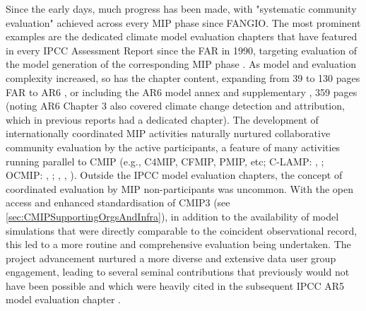 \documentclass[gmd, preprint]{copernicus}
\begin{document}
Since the early days, much progress has been made, with "systematic community evaluation" achieved across every MIP phase since FANGIO. The most prominent examples are the dedicated climate model evaluation chapters that have featured in every IPCC Assessment Report since the FAR in 1990, targeting evaluation of the model generation of the corresponding MIP phase \citep[e.g.,][]{gates_validation_1990,gates_climate_1996,mcavaney_model_2001,randall_climate_2007,flato_evaluation_2013,eyring_human_2021}. As model and evaluation complexity increased, so has the chapter content, expanding from 39 to 130 pages FAR to AR6  \citep{gates_validation_1990,eyring_human_2021}, or including the AR6 model annex \citep{gutierrez_models_2021} and supplementary \citep{eyring_human_2021-1}, 359 pages (noting AR6 Chapter 3 also covered climate change detection and attribution, which in previous reports had a dedicated chapter). The development of internationally coordinated MIP activities naturally nurtured collaborative community evaluation by the active participants, a feature of many activities running parallel to CMIP (e.g., C4MIP, CFMIP, PMIP, etc; C-LAMP: \citeauthor{hoffman_results_2007}, \citeyear{hoffman_results_2007}; OCMIP: \citeauthor{orr_ocean_1999}, \citeyear{orr_ocean_1999}; 
\citeauthor{dutay_evaluation_2002}, \citeyear{dutay_evaluation_2002}, 
\citeyear{dutay_evaluation_2004}). Outside the IPCC model evaluation chapters, the concept of coordinated evaluation by MIP non-participants was uncommon. With the open access and enhanced standardisation of CMIP3 (see \autoref{sec:CMIPSupportingOrgsAndInfra}), in addition to the availability of model simulations that were directly comparable to the coincident observational record, this led to a more routine and comprehensive evaluation being undertaken. The project advancement nurtured a more diverse and extensive data user group engagement, leading to several seminal contributions that previously would not have been possible \citep{gleckler_performance_2008,eyring_assessment_2006,waugh_quantitative_2008} and which were heavily cited in the subsequent IPCC AR5 model evaluation chapter \citep{flato_evaluation_2013}.
\end{document}
